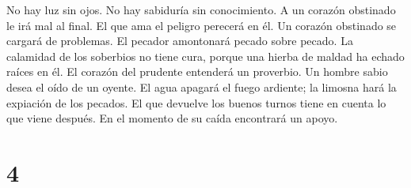  No hay luz sin ojos. No hay sabiduría sin conocimiento.
 A un corazón obstinado le irá mal al final. El que ama
el peligro perecerá en él.  Un corazón obstinado se
cargará de problemas. El pecador amontonará pecado sobre pecado.
 La calamidad de los soberbios no tiene cura, porque una
hierba de maldad ha echado raíces en él.  El corazón del
prudente entenderá un proverbio. Un hombre sabio desea el oído de un
oyente.  El agua apagará el fuego ardiente; la limosna
hará la expiación de los pecados.  El que devuelve los
buenos turnos tiene en cuenta lo que viene después. En el momento de su
caída encontrará un apoyo.

\hypertarget{section-3}{%
\section{4}\label{section-3}}

